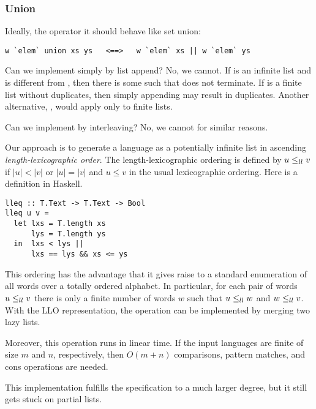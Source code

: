 \subsubsection{Union}
Ideally, the  operator it should behave like
set union:
\begin{lstlisting}
w `elem` union xs ys   <==>   w `elem` xs || w `elem` ys
\end{lstlisting}
Can we implement  simply by list append?
No, we cannot. 
If  is an infinite list and  is different from
, then there is some  such that
 does not terminate.
If  is a finite list without duplicates, then simply
appending  may result in duplicates.
Another alternative, , would apply only to finite lists.

Can we implement  by interleaving? No, we cannot for
similar reasons.

Our approach is to generate a language as a potentially infinite list
in ascending \emph{length-lexicographic order}. The
length-lexicographic ordering is defined by $u \le_{ll} 
v$ if $|u|<|v|$ or $|u|=|v|$ and $u\le v$ in the usual lexicographic
ordering. Here is a definition in Haskell.
\begin{lstlisting}
lleq :: T.Text -> T.Text -> Bool
lleq u v =
  let lxs = T.length xs
      lys = T.length ys
  in  lxs < lys ||
      lxs == lys && xs <= ys
\end{lstlisting}
This ordering has the advantage that it gives raise to a standard
enumeration of all words over a totally ordered alphabet. In
particular, for each pair of words $u \le_{ll} v$ there is only a finite
number of words $w$ such that $u \le_{ll} w$ and $w \le_{ll} v$. 
With the LLO representation, the  operation can be
implemented by merging two lazy lists.

Moreover, this operation runs in linear time. If the input languages
are finite of size $m$ and $n$, respectively, then $O(m+n)$
comparisons, pattern matches, and cons operations are needed.

This implementation fulfills the specification to a much larger
degree, but it still gets stuck on partial lists.


